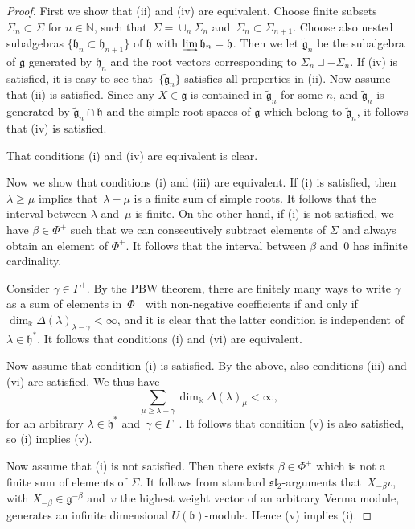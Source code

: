 \documentclass[11pt]{amsart}
\newcommand{\rR}{\Phi}
\newcommand{\mk}{\Bbbk}
\newcommand{\fg}{\mathfrak{g}}
\newcommand{\fh}{\mathfrak{h}}
\newcommand{\fb}{\mathfrak{b}}
\newcommand{\mN}{\mathbb{N}}
\numberwithin{equation}{section}
\theoremstyle{plain}
\theoremstyle{remark}
\theoremstyle{remark}
\theoremstyle{construction}
\begin{document}
\begin{proof}
First we show that (ii) and (iv) are equivalent. Choose finite subsets $\Sigma_n\subset\Sigma $ for $n\in\mN$, such that~$\Sigma =\cup_n\Sigma_n$ and~$\Sigma_n\subset\Sigma_{n+1}$. Choose also nested subalgebras $\{\fh_n\subset\fh_{n+1}\}$ of $\fh$ with $\varinjlim\fh_n=\fh$. Then we let $\widetilde{\fg}_n$ be the subalgebra of $\fg$ generated by $\fh_n$ and the root vectors corresponding to $\Sigma_n\sqcup -\Sigma_n$. If (iv) is satisfied, it is easy to see that~$\{\widetilde{\fg}_n\}$ satisfies all properties in (ii). Now assume that (ii) is satisfied. Since any $X\in \fg$ is contained in $\widetilde{\fg}_n$ for some $n$, and $\widetilde{\fg}_n$ is generated by $\widetilde{\fg}_n\cap\fh$ and the simple root spaces of $\fg$ which belong to $\widetilde{\fg}_n$, it follows that (iv) is satisfied.



That {conditions} (i) and (iv) are equivalent is clear.

Now we show that {conditions} (i) and (iii) are equivalent. If (i) is satisfied, then $\lambda\ge \mu$ implies that~$\lambda-\mu$ is a finite sum of simple roots. It follows that the interval between $\lambda$ and~$\mu$ is finite. On the other hand, if (i) is not satisfied, we have $\beta\in\rR^+$ such that we can consecutively subtract elements of $\Sigma $ and always obtain an element of $\rR^+$. It follows that the interval between $\beta$ and~$0$ has infinite cardinality.

Consider $\gamma\in\Gamma^+$. By the PBW theorem, there are finitely many ways to write $\gamma$ as a sum of elements in~$\rR^+$ with non-negative coefficients if and only if $\dim_{\mk} \Delta(\lambda)_{\lambda-\gamma}<\infty$, and it is clear that the latter condition is independent of $\lambda\in\fh^\ast$. It follows that {conditions} (i) and (vi) are equivalent.

Now assume that {condition} (i) is satisfied. By the above, also {conditions} (iii) and (vi) are satisfied. We thus have
$$\sum_{\mu\ge \lambda-\gamma}\dim_{\mk}\Delta(\lambda)_{\mu}<\infty,$$
for an arbitrary $\lambda\in\fh^\ast$ and~$\gamma\in\Gamma^+$.
It follows that {condition} (v) is also satisfied, so (i) implies (v).

Now assume that (i) is not satisfied. Then there exists $\beta\in\rR^+$ which is not a finite sum of elements of $\Sigma $. It follows from standard $\mathfrak{sl}_2$-arguments that~$X_{-\beta}v$, with $X_{-\beta}\in \fg^{-\beta}$ and~$v$ the highest weight vector of an arbitrary Verma module, generates an infinite dimensional $U(\fb)$-module. Hence (v) implies (i).
\end{proof}
\end{document}
